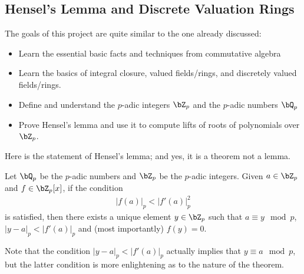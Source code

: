 \subsection{Hensel's Lemma and Discrete Valuation Rings}
The goals of this project are quite similar to the one already discussed:
\begin{itemize}
	\item Learn the essential basic facts and techniques from commutative algebra
	\item Learn the basics of integral closure, valued fields/rings, and discretely valued fields/rings.
	\item Define and understand the $p$-adic integers $\bZ_p$ and the $p$-adic numbers $\bQ_p$
	\item Prove Hensel's lemma and use it to compute lifts of roots of polynomials over $\bZ_p$.
\end{itemize}
Here is the statement of Hensel's lemma; and yes, it is a theorem not a lemma.
\begin{thm}\label{thm:hensels-lemma}
	Let $\bQ_p$ be the $p$-adic numbers and $\bZ_p$ be the $p$-adic integers. Given $a \in \bZ_p$ and $f \in \bZ_p[x]$, if the condition 
	\begin{align*}
		\left|f(a)\right|_p < \left|f'(a)\right|_p^2
	\end{align*}
	is satisfied, then there exists a unique element $y \in \bZ_p$ such that $a \equiv y \mod p$, $|y - a|_p < |f'(a)|_p$ and (most importantly) $f(y) = 0$.
\end{thm}
Note that the condition $|y - a|_p < |f'(a)|_p$ actually implies that $y \equiv a \mod p$, but the latter condition is more enlightening as to the nature of the theorem.


